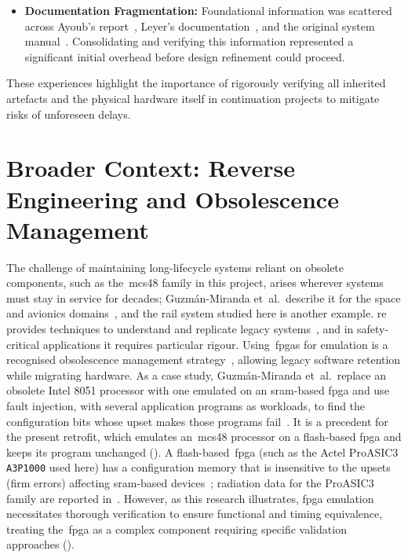 \begin{itemize}
	\item \textbf{Documentation Fragmentation:} Foundational information was scattered across Ayoub's report~\cite{ayoub2014}, Leyer's documentation~\cite{leyer2023, leyer2023ppt}, and the original system manual~\cite{rexroth1992wsp}. Consolidating and verifying this information represented a significant initial overhead before design refinement could proceed.
\end{itemize}
These experiences highlight the importance of rigorously verifying all inherited artefacts and the physical hardware itself in continuation projects to mitigate risks of unforeseen delays.

\section{Broader Context: Reverse Engineering and Obsolescence Management}
\label{sec:re_obsolescence}
The challenge of maintaining long-lifecycle systems reliant on obsolete components, such as the~\gls{mcs48} family in this project, arises wherever systems must stay in service for decades; Guzmán-Miranda et~al.\ describe it for the space and avionics domains~\cite{guzman2011obsolescence}, and the rail system studied here is another example. \Gls{re} provides techniques to understand and replicate legacy systems~\cite{wang2010}, and in safety-critical applications it requires particular rigour. Using~\glspl{fpga} for emulation is a recognised obsolescence management strategy~\cite{guzman2011obsolescence}, allowing legacy software retention while migrating hardware. As a case study, Guzmán-Miranda et~al.\ replace an obsolete Intel 8051 processor with one emulated on an \gls{sram}-based \gls{fpga} and use fault injection, with several application programs as workloads, to find the configuration bits whose upset makes those programs fail~\cite[Sec.~VII]{guzman2011obsolescence}. It is a precedent for the present retrofit, which emulates an~\gls{mcs48} processor on a flash-based \gls{fpga} and keeps its program unchanged (). A flash-based~\gls{fpga} (such as the Actel ProASIC3 \texttt{A3P1000} used here) has a configuration memory that is insensitive to the upsets (firm errors) affecting \gls{sram}-based devices~\cite{guzman2011obsolescence}; radiation data for the ProASIC3 family are reported in~\cite{poivey2011proasic3}. However, as this research illustrates, \gls{fpga} emulation necessitates thorough verification to ensure functional and timing equivalence, treating the~\gls{fpga} as a complex component requiring specific validation approaches ().

